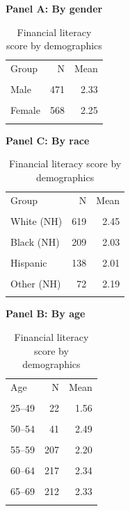 \begin{table}[htbp]\centering\small
\caption{Financial literacy score by demographics}
\label{tab:finlit_score_demographics_panels}
\begin{minipage}[t]{0.48\textwidth}\centering
\textbf{Panel A: By gender}\\[0.3em]
\begin{tabular}{lrr}\toprule
Group & N & Mean \\\\ \midrule
Male & 471 & 2.33 \\\\
Female & 568 & 2.25 \\\\
\bottomrule\end{tabular}
\end{minipage}
\hfill
\begin{minipage}[t]{0.48\textwidth}\centering
\textbf{Panel C: By race}\\[0.3em]
\begin{tabular}{lrr}\toprule
Group & N & Mean \\\\ \midrule
White (NH) & 619 & 2.45 \\\\
Black (NH) & 209 & 2.03 \\\\
Hispanic & 138 & 2.01 \\\\
Other (NH) & 72 & 2.19 \\\\
\bottomrule\end{tabular}
\end{minipage}
\par\vspace{0.8em}
\begin{minipage}[t]{0.48\textwidth}\centering
\textbf{Panel B: By age}\\[0.3em]
\begin{tabular}{lrr}\toprule
Age & N & Mean \\\\ \midrule
25--49 & 22 & 1.56 \\\\
50--54 & 41 & 2.49 \\\\
55--59 & 207 & 2.20 \\\\
60--64 & 217 & 2.34 \\\\
65--69 & 212 & 2.33 \\\\

\end{tabular}
\end{minipage}
\end{table}

